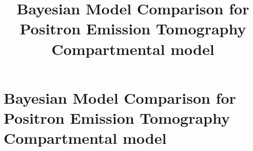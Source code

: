 \ifx\inthesis\undefined %

\title{Bayesian Model Comparison for Positron Emission Tomography
  Compartmental model}

\maketitle
\else %
\chapter{Bayesian Model Comparison for Positron Emission Tomography
  Compartmental model}
\label{cha:Bayesian Model Comparison for Positron Emission Tomography
  Compartmental model}
\fi %


\ifx\inthesis\undefined
\printbibliography
\else\relax\fi
